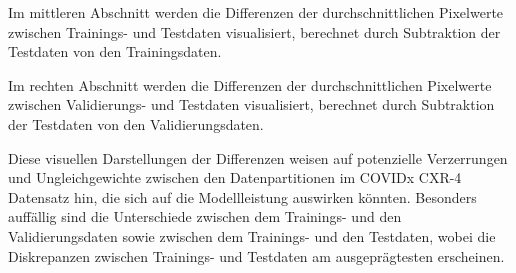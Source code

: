 Im mittleren Abschnitt werden die Differenzen der durchschnittlichen Pixelwerte zwischen Trainings- und Testdaten visualisiert, berechnet durch Subtraktion der Testdaten von den Trainingsdaten. 

Im rechten Abschnitt werden die Differenzen der durchschnittlichen Pixelwerte zwischen Validierungs- und Testdaten visualisiert, berechnet durch Subtraktion der Testdaten von den Validierungsdaten.

Diese visuellen Darstellungen der Differenzen weisen auf potenzielle Verzerrungen und Ungleichgewichte zwischen den Datenpartitionen im COVIDx CXR-4 Datensatz hin, die sich auf die Modellleistung auswirken könnten. Besonders auffällig sind die Unterschiede zwischen dem Trainings- und den Validierungsdaten sowie zwischen dem Trainings- und den Testdaten, wobei die Diskrepanzen zwischen Trainings- und Testdaten am ausgeprägtesten erscheinen.

\newpage